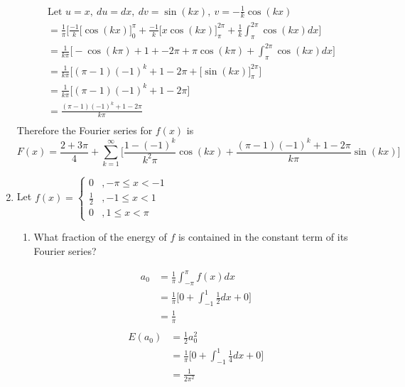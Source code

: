 \documentclass{article}
\begin{document}
\begin{enumerate}
\begin{align*}
            &\text{Let } u = x,\: du = dx,\: dv = \sin(kx),\: v = -\frac{1}{k}\cos(kx) \\
            &= \frac{1}{\pi} \Bigg[\frac{-1}{k}\Big[\cos(kx)\Big]_{0}^{\pi} + \frac{-1}{k}\Big[x\cos(kx) \Big]_{\pi}^{2\pi} + \frac{1}{k}\int_{\pi}^{2\pi}\cos(kx)dx\Bigg]\\ 
            &= \frac{1}{k\pi} \Bigg[-\cos(k\pi) + 1 + -2\pi + \pi\cos(k\pi) + \int_{\pi}^{2\pi}\cos(kx)dx\Bigg]\\ 
            &= \frac{1}{k\pi} \Bigg[(\pi-1)(-1)^k+ 1 - 2\pi + \Big[\sin(kx)\Big]_{\pi}^{2\pi}\Bigg]\\ 
            &= \frac{1}{k\pi} \Bigg[(\pi-1)(-1)^k+ 1 - 2\pi\Bigg]\\ 
            &= \frac{(\pi-1)(-1)^k+ 1 - 2\pi}{k\pi} \\ 
        \end{align*}
        Therefore the Fourier series for $f(x)$ is 
        \[
        F(x) = \frac{2 + 3\pi}{4} + \sum_{k=1}^{\infty} \Bigg[\frac{1 - (-1)^k}{k^2\pi}\cos(kx) + \frac{(\pi-1)(-1)^k+ 1 - 2\pi}{k\pi}\sin(kx)\Bigg]
        \]
    \newpage
    \item Let $\displaystyle f(x) = \begin{cases}
                                        0 &, -\pi \leq x < -1 \\
                                        \frac{1}{2} &, -1 \leq x < 1 \\
                                        0 &, 1 \leq x < \pi
                                    \end{cases}$
    \begin{enumerate}
    \item What fraction of the energy of $f$ is contained in the constant term of its Fourier series?
    \begin{multicols}{2}
        \begin{align*}
            a_0 &= \frac{1}{\pi} \int^{\pi}_{-\pi}f(x)dx\\
            &= \frac{1}{\pi}\Bigg[ 0  + \int_{-1}^{1}\frac{1}{2}dx + 0 \Bigg]\\
            &= \frac{1}{\pi} \\
        \end{align*}
        \begin{align*}
            E(a_0) &= \frac{1}{2}a_0^2 \\
            &= \frac{1}{\pi}\Bigg[ 0  + \int_{-1}^{1}\frac{1}{4}dx + 0 \Bigg]\\
            &= \frac{1}{2\pi^2} \\

\end{align*}
\end{multicols}
\end{enumerate}
\end{enumerate}
\end{document}
